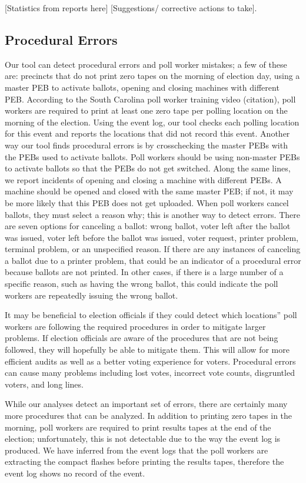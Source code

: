 [Statistics from reports here] [Suggestions/ corrective actions to take].  

\subsection{Procedural Errors}
Our tool can detect procedural errors and poll worker mistakes; a few of these are: precincts that do not print zero tapes on the morning of election day, using a master PEB to activate ballots, opening and closing machines with different PEB.  According to the South Carolina poll worker training video (citation), poll workers are required to print at least one zero tape per polling location on the morning of the election.  Using the event log, our tool checks each polling location for this event and reports the locations that did not record this event.  Another way our tool finds procedural errors is by crosschecking the master PEBs with the PEBs used to activate ballots.  Poll workers should be using non-master PEBs to activate ballots so that the PEBs do not get switched.  Along the same lines, we report incidents of opening and closing a machine with different PEBs.  A machine should be opened and closed with the same master PEB; if not, it may be more likely that this PEB does not get uploaded.   When poll workers cancel ballots, they must select a reason why; this is another way to detect errors.  There are seven options for canceling a ballot: wrong ballot, voter left after the ballot was issued, voter left before the ballot was issued, voter request, printer problem, terminal problem, or an unspecified reason.  If there are any instances of canceling a ballot due to a printer problem, that could be an indicator of a procedural error because ballots are not printed.  In other cases, if there is a large number of a specific reason, such as having the wrong ballot, this could indicate the poll workers are repeatedly issuing the wrong ballot.  

It may be beneficial to election officials if they could detect which locations'' poll workers are following the required procedures in order to mitigate larger problems.  If election officials are aware of the procedures that are not being followed, they will hopefully be able to mitigate them.  This will allow for more efficient audits as well as a better voting experience for voters.  Procedural errors can cause many problems including lost votes, incorrect vote counts, disgruntled voters, and long lines.

While our analyses detect an important set of errors, there are certainly many more procedures that can be analyzed.  In addition to printing zero tapes in the morning, poll workers are required to print results tapes at the end of the election; unfortunately, this is not detectable due to the way the event log is produced.  We have inferred from the event logs that the poll workers are extracting the compact flashes before printing the results tapes, therefore the event log shows no record of the event.  

